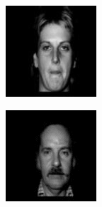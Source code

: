 \begin{figure}[ht]
  \centering
  \begin{subfigure}[b]{0.15\textwidth}
    \centering
    \includegraphics[width=\textwidth]{images/q3_face_1a.png}
  \end{subfigure}
  \hfill
  \begin{subfigure}[b]{0.15\textwidth}
    \centering
    \includegraphics[width=\textwidth]{images/q3_face_2a.png}

\end{subfigure}
\end{figure}
